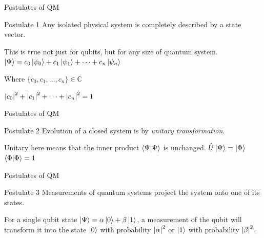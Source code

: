 \documentclass{beamer}
\begin{document}
\begin{frame}[label=p1]{Postulates of QM}
\begin{block}{Postulate 1}
Any isolated physical system is completely described by a state vector.
\end{block}\vfill
This is true not just for qubits, but for any size of quantum system.
\vfill
\centering
\begin{math}
    \ket{\Psi} = c_0\ket{\psi_0} + c_1\ket{\psi_1} + \dots + c_n\ket{\psi_n}
\end{math}\vfill

Where $\{c_0, c_1, \dots, c_n\} \in \mathbb{C}$\vfill

\begin{math}
    \abs{c_0}^2 + \abs{c_1}^2 + \dots + \abs{c_n}^2 = 1
\end{math}\vfill
\end{frame}

\begin{frame}{Postulates of QM}
\begin{block}{Postulate 2}
    Evolution of a closed system is by \emph{unitary transformation}.
\end{block}\vfill

Unitary here means that the inner product $\braket{\Psi}{\Psi}$ is unchanged.\vfill
\centering
\begin{math}
    \hat{U}\ket{\Psi} = \ket{\Phi}
\end{math}\vfill
\begin{math}
    \braket{\Phi}{\Phi} = 1
\end{math}

\end{frame}

\begin{frame}{Postulates of QM}
\begin{block}{Postulate 3}
    Measurements of quantum systems project the system onto one of its states.
\end{block}\vfill
For a single qubit state $\ket{\Psi} = \alpha\ket{0} + \beta\ket{1}$, a measurement of the qubit will transform it into the state $\ket{0}$ with probability $\abs{\alpha}^2$ or $\ket{1}$ with probability $\abs{\beta}^2$.

\end{frame}
\end{document}
